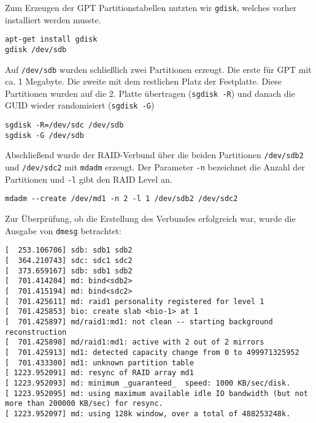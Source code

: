 Zum Erzeugen der GPT Partitionstabellen nutzten wir \verb#gdisk#, welches vorher installiert werden musste.
\begin{verbatim}
apt-get install gdisk
gdisk /dev/sdb
\end{verbatim}
Auf \verb#/dev/sdb# wurden schließlich zwei Partitionen erzeugt. Die erste für GPT mit ca. 1 Megabyte. Die zweite mit dem restlichen Platz der Festplatte.
Diese Partitionen wurden auf die 2. Platte übertragen (\verb#sgdisk -R#) und danach die GUID wieder randomisiert (\verb#sgdisk -G#)
\begin{verbatim}
sgdisk -R=/dev/sdc /dev/sdb
sgdisk -G /dev/sdb
\end{verbatim}
Abschließend wurde der RAID-Verbund über die beiden Partitionen \verb#/dev/sdb2# und \verb#/dev/sdc2# mit \verb#mdadm# erzeugt. Der Parameter \verb#-n# bezeichnet die Anzahl der Partitionen und \verb#-l# gibt den RAID Level an.
\begin{verbatim}
mdadm --create /dev/md1 -n 2 -l 1 /dev/sdb2 /dev/sdc2
\end{verbatim}
Zur Überprüfung, ob die Erstellung des Verbundes erfolgreich war, wurde die Ausgabe von \verb#dmesg# betrachtet:
\setupVerbatimOut
\begin{verbatim}
[  253.106706] sdb: sdb1 sdb2
[  364.210743] sdc: sdc1 sdc2
[  373.659167] sdb: sdb1 sdb2
[  701.414204] md: bind<sdb2>
[  701.415194] md: bind<sdc2>
[  701.425611] md: raid1 personality registered for level 1
[  701.425853] bio: create slab <bio-1> at 1
[  701.425897] md/raid1:md1: not clean -- starting background reconstruction
[  701.425898] md/raid1:md1: active with 2 out of 2 mirrors
[  701.425913] md1: detected capacity change from 0 to 499971325952
[  701.433300] md1: unknown partition table
[ 1223.952091] md: resync of RAID array md1
[ 1223.952093] md: minimum _guaranteed_  speed: 1000 KB/sec/disk.
[ 1223.952095] md: using maximum available idle IO bandwidth (but not more than 200000 KB/sec) for resync.
[ 1223.952097] md: using 128k window, over a total of 488253248k.
\end{verbatim}

